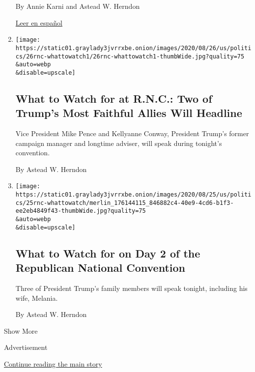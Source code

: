 \begin{enumerate}
  By Annie Karni and Astead W. Herndon

  \href{https://www.nytimes3xbfgragh.onion/es/2020/08/31/espanol/estados-unidos/Joe-biden-donald-trump-campana.html}{Leer
  en español}
\item
  \href{/2020/08/26/us/politics/republican-national-convention-guide.html}{}

  \texttt{[image: https://static01.graylady3jvrrxbe.onion/images/2020/08/26/us/politics/26rnc-whattowatch1/26rnc-whattowatch1-thumbWide.jpg?quality=75\\\&auto=webp\\\&disable=upscale]}

  \hypertarget{what-to-watch-for-at-rnc-two-of-trumps-most-faithful-allies-will-headline}{%
  \subsection{What to Watch for at R.N.C.: Two of Trump's Most Faithful
  Allies Will
  Headline}\label{what-to-watch-for-at-rnc-two-of-trumps-most-faithful-allies-will-headline}}

  Vice President Mike Pence and Kellyanne Conway, President Trump's
  former campaign manager and longtime adviser, will speak during
  tonight's convention.

  By Astead W. Herndon
\item
  \href{/2020/08/25/us/politics/republican-national-convention-guide.html}{}

  \texttt{[image: https://static01.graylady3jvrrxbe.onion/images/2020/08/25/us/politics/25rnc-whattowatch/merlin\_176144115\_846882c4-40e9-4cd6-b1f3-ee2eb4849f43-thumbWide.jpg?quality=75\\\&auto=webp\\\&disable=upscale]}

  \hypertarget{what-to-watch-for-on-day-2-of-the-republican-national-convention}{%
  \subsection{What to Watch for on Day 2 of the Republican National
  Convention}\label{what-to-watch-for-on-day-2-of-the-republican-national-convention}}

  Three of President Trump's family members will speak tonight,
  including his wife, Melania.

  By Astead W. Herndon
\end{enumerate}

Show More

Advertisement

\protect\hyperlink{after-mid2}{Continue reading the main story}


